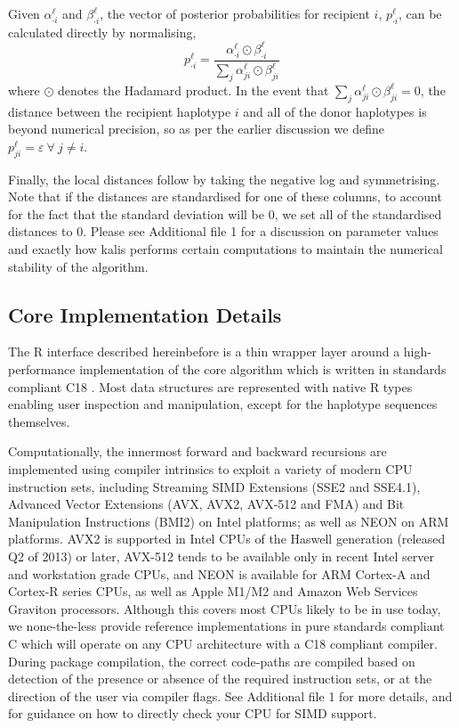 \documentclass[pdflatex,referee,lineno,sn-nature]{sn-jnl}%
\let\proglang=\textsf
\newcommand{\pkg}[1]{{\fontseries{m}\fontseries{b}\selectfont #1}}
\begin{document}
Given \(\alpha_{\cdot i}^\ell\) and \(\beta_{\cdot i}^\ell\), the vector of posterior probabilities for recipient \(i\), \(p^\ell_{\cdot i}\), can be calculated directly by normalising,
\begin{equation}
	p^\ell_{\cdot i} = \frac{\alpha^\ell_{\cdot i} \odot \beta^\ell_{\cdot i}}{\sum\limits_j \alpha^\ell_{ji} \odot \beta^\ell_{ji}} \label{eq:postprob}
\end{equation}
where \(\odot\) denotes the Hadamard product.
In the event that \(\sum\limits_j \alpha^\ell_{ji} \odot \beta^\ell_{ji} = 0\), the distance between the recipient haplotype \(i\) and all of the donor haplotypes is beyond numerical precision, so as per the earlier discussion we define \(p_{ji}^\ell = \varepsilon \ \forall\ j \ne i\).

Finally, the local distances follow by taking the negative log and symmetrising.
Note that if the distances are standardised for one of these columns, to account for the fact that the standard deviation will be 0, we set all of the standardised distances to 0.
Please see Additional file 1 for a discussion on parameter values and exactly how \pkg{kalis} performs certain computations to maintain the numerical stability of the algorithm.



\subsection*{Core Implementation Details}
\label{sec:core}

The \proglang{R} interface described hereinbefore is a thin wrapper layer around a high-performance implementation of the core algorithm which is written in standards compliant C18 \cite{C18}.
Most data structures are represented with native \proglang{R} types enabling user inspection and manipulation, except for the haplotype sequences themselves.

Computationally, the innermost forward and backward recursions are implemented using compiler intrinsics to exploit a variety of modern CPU instruction sets, including Streaming SIMD Extensions (SSE2 and SSE4.1), Advanced Vector Extensions (AVX, AVX2, AVX-512 and FMA) and Bit Manipulation Instructions (BMI2) on Intel platforms; as well as NEON on ARM platforms.
AVX2 is supported in Intel CPUs of the Haswell generation (released Q2 of 2013) or later, AVX-512 tends to be available only in recent Intel server and workstation grade CPUs, and NEON is available for ARM Cortex-A and Cortex-R series CPUs, as well as Apple M1/M2 and Amazon Web Services Graviton processors.
Although this covers most CPUs likely to be in use today, we none-the-less provide reference implementations in pure standards compliant \proglang{C} which will operate on any CPU architecture with a C18 compliant compiler.
During package compilation, the correct code-paths are compiled based on detection of the presence or absence of the required instruction sets, or at the direction of the user via compiler flags.
See Additional file 1 for more details, and for guidance on how to directly check your CPU for SIMD support.
\end{document}
